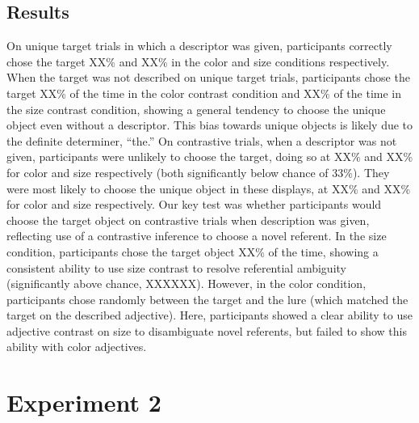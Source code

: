\documentclass[10pt, letterpaper]{article}
\begin{document}
\subsection{Results}\label{results}

On unique target trials in which a descriptor was given, participants
correctly chose the target XX\% and XX\% in the color and size
conditions respectively. When the target was not described on unique
target trials, participants chose the target XX\% of the time in the
color contrast condition and XX\% of the time in the size contrast
condition, showing a general tendency to choose the unique object even
without a descriptor. This bias towards unique objects is likely due to
the definite determiner, ``the.'' On contrastive trials, when a
descriptor was not given, participants were unlikely to choose the
target, doing so at XX\% and XX\% for color and size respectively (both
significantly below chance of 33\%). They were most likely to choose the
unique object in these displays, at XX\% and XX\% for color and size
respectively. Our key test was whether participants would choose the
target object on contrastive trials when description was given,
reflecting use of a contrastive inference to choose a novel referent. In
the size condition, participants chose the target object XX\% of the
time, showing a consistent ability to use size contrast to resolve
referential ambiguity (significantly above chance, XXXXXX). However, in
the color condition, participants chose randomly between the target and
the lure (which matched the target on the described adjective). Here,
participants showed a clear ability to use adjective contrast on size to
disambiguate novel referents, but failed to show this ability with color
adjectives.

\section{Experiment 2}\label{experiment-2}
\end{document}
